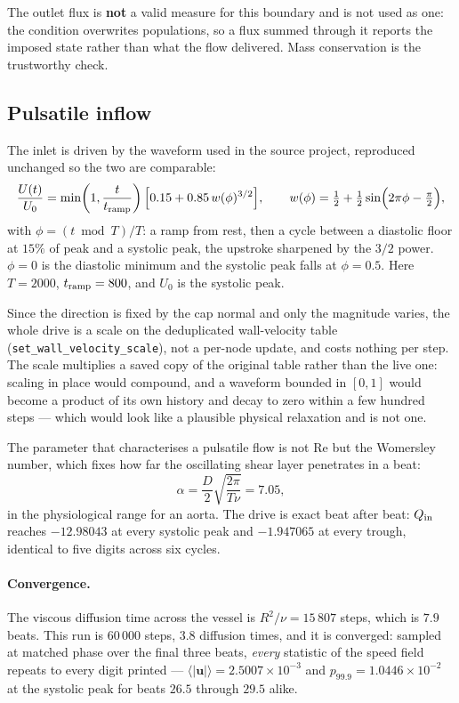 \documentclass[11pt,a4paper]{article}
\newcommand{\code}[1]{\texttt{\small #1}}
\newcommand{\uu}{\bm{u}}
\newcommand{\e}[1]{\times 10^{#1}}
\begin{document}
The outlet flux is \textbf{not} a valid measure for this boundary and is not used
as one: the condition overwrites populations, so a flux summed through it
reports the imposed state rather than what the flow delivered. Mass conservation
is the trustworthy check.

\subsection{Pulsatile inflow}
\label{sec:aortapulse}

The inlet is driven by the waveform used in the source project, reproduced
unchanged so the two are comparable:
\begin{equation}
  \frac{U(t)}{U_0} = \min\!\left(1,\frac{t}{t_{\rm ramp}}\right)
    \Big[0.15 + 0.85\,w(\phi)^{3/2}\Big],
  \qquad
  w(\phi) = \tfrac12 + \tfrac12\sin\!\Big(2\pi\phi - \tfrac{\pi}{2}\Big),
  \label{eq:aortawave}
\end{equation}
with $\phi = (t \bmod T)/T$: a ramp from rest, then a cycle between a diastolic
floor at $15\%$ of peak and a systolic peak, the upstroke sharpened by the $3/2$
power. $\phi=0$ is the diastolic minimum and the systolic peak falls at
$\phi=0.5$. Here $T=2000$, $t_{\rm ramp}=800$, and $U_0$ is the systolic peak.

Since the direction is fixed by the cap normal and only the magnitude varies, the
whole drive is a scale on the deduplicated wall-velocity table
(\code{set\_wall\_velocity\_scale}), not a per-node update, and costs nothing per
step. The scale multiplies a saved copy of the original table rather than the
live one: scaling in place would compound, and a waveform bounded in $[0,1]$
would become a product of its own history and decay to zero within a few hundred
steps --- which would look like a plausible physical relaxation and is not one.

The parameter that characterises a pulsatile flow is not $\mathrm{Re}$ but the
Womersley number, which fixes how far the oscillating shear layer penetrates in a
beat:
\begin{equation}
  \alpha = \frac{D}{2}\sqrt{\frac{2\pi}{T\nu}} = 7.05 ,
  \label{eq:womersley}
\end{equation}
in the physiological range for an aorta. The drive is exact beat after beat:
$Q_{\rm in}$ reaches $-12.98043$ at every systolic peak and $-1.947065$ at every
trough, identical to five digits across six cycles.

\paragraph{Convergence.} The viscous diffusion time across the vessel is
$R^2/\nu = 15\,807$ steps, which is $7.9$ beats. This run is $60\,000$ steps,
$3.8$ diffusion times, and it is converged: sampled at matched phase over the
final three beats, \emph{every} statistic of the speed field repeats to every
digit printed --- $\langle|\uu|\rangle = 2.5007\e{-3}$ and $p_{99.9} =
1.0446\e{-2}$ at the systolic peak for beats $26.5$ through $29.5$ alike.
\end{document}
